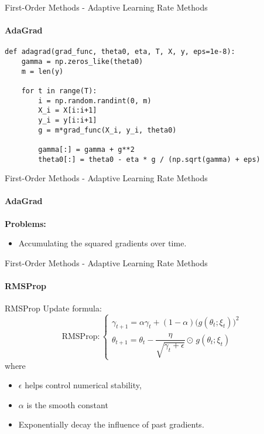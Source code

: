 \documentclass{beamer}
\begin{document}
\begin{frame}[fragile]{First-Order Methods - Adaptive Learning Rate Methods}
\framesubtitle{AdaGrad}
\begin{verbatim}
def adagrad(grad_func, theta0, eta, T, X, y, eps=1e-8):
    gamma = np.zeros_like(theta0) 
    m = len(y)
    
    for t in range(T):
        i = np.random.randint(0, m)
        X_i = X[i:i+1]
        y_i = y[i:i+1]
        g = m*grad_func(X_i, y_i, theta0)
        
        gamma[:] = gamma + g**2
        theta0[:] = theta0 - eta * g / (np.sqrt(gamma) + eps)
\end{verbatim}
\end{frame}

\begin{frame}[fragile]{First-Order Methods - Adaptive Learning Rate Methods}
\framesubtitle{AdaGrad}
\textbf{Problems:}
\begin{itemize}
    \item Accumulating the squared gradients over time.
\end{itemize}
\end{frame}

\begin{frame}[fragile]{First-Order Methods - Adaptive Learning Rate Methods}
\framesubtitle{RMSProp}
\begin{block}{RMSProp}
Update formula:
\[
\text{RMSProp}:\begin{cases}
\gamma_{t+1} = \alpha\gamma_{t} + (1-\alpha)\big(g(\theta_{t}; \xi_t)\big)^2 \\
\theta_{t+1} = \theta_{t} - \dfrac{\eta}{\sqrt{\gamma_{t}+\epsilon}} \odot\, g(\theta_{t}; \xi_t)
\end{cases}
\]
where
\begin{itemize}
    \item $\epsilon$ helps control numerical stability,
    \item $\alpha$ is the smooth constant
\end{itemize}
\begin{itemize}
    \item Exponentially decay the influence of past gradients.
\end{itemize}
\end{block}

\end{frame}
\end{document}
